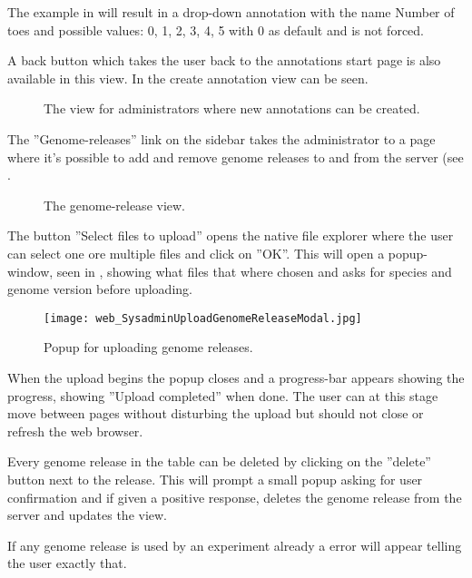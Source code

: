 The example in  will result in a drop-down annotation with the name Number of toes and possible values: 0, 1, 2, 3, 4, 5 with 0 as default and is not forced.

A back button which takes the user back to the annotations start page is also available in this view. In  the create annotation view can be seen.

\begin{figure}[t]
 \caption{The view for administrators where new annotations can be created.}
 \label{adm_web_createView}
\end{figure}

The ''Genome-releases'' link on the sidebar takes the administrator to a page where it's possible to add and remove genome releases to and from the server (see .

\begin{figure}[h]
 \caption{The genome-release view.}
 \label{adm_web_genomereleaseView}
\end{figure}

The button ''Select files to upload'' opens the native file explorer where the user can select one ore multiple files and click on ''OK''. This will open a popup-window, seen in , showing what files that where chosen and asks for species and genome version before uploading. 

\begin{figure}[h]
 \centering
 \texttt{[image: web\_SysadminUploadGenomeReleaseModal.jpg]}
 \caption{Popup for uploading genome releases.}
 \label{adm_web_uploadconfirm}
\end{figure}

When the upload begins the popup closes and a progress-bar appears showing the progress, showing ''Upload completed'' when done. The user can at this stage move between pages without disturbing the upload but should not close or refresh the web browser. 

Every genome release in the table can be deleted by clicking on the ''delete'' button next to the release. This will prompt a small popup asking for user confirmation and if given a positive response, deletes the genome release from the server and updates the view. 

If any genome release is used by an experiment already a error will appear telling the user exactly that. 

